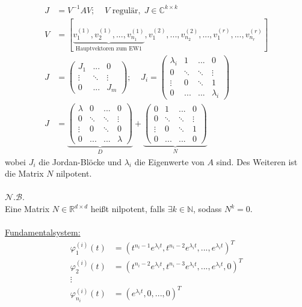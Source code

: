 \documentclass[a4paper,twocolumn,10pt]{article}
\begin{document}
\begin{equation*}
\begin{split}
J&=V^{-1}AV;\;\;\;\;V\text{ regulär},\;J\in\mathbb{C}^{k\times k}\\
V&=[\underbrace{v_1^{(1)},v_2^{(1)},...,v_{n_1}^{(1)}}_{\text{Hauptvektoren zum EW1}},v_1^{(2)},...,v_{n_2}^{(2)},...,v_1^{(r)},...,v_{n_r}^{(r)}]\\
J&=\begin{pmatrix}J_1 & ... & 0 \\ \vdots & \ddots & \vdots \\ 0 & ... & J_m\end{pmatrix};\;\;\;\;J_i=\begin{pmatrix}\lambda_i & 1 & ... & 0 \\ 0 & \ddots & \ddots & \vdots \\ \vdots & 0 & \ddots & 1 \\ 0 & ... & ... & \lambda_i\end{pmatrix}\\
J&=\underbrace{\begin{pmatrix}\lambda & 0 & ... & 0 \\ 0 & \ddots & \ddots & \vdots \\ \vdots & 0 & \ddots & 0 \\ 0 & ... & ... & \lambda\end{pmatrix}}_{D}+\underbrace{\begin{pmatrix}0 & 1 & ... & 0 \\ 0 & \ddots & \ddots & \vdots \\ \vdots & 0 & \ddots & 1 \\ 0 & ... & ... & 0\end{pmatrix}}_{N}
\end{split}
\end{equation*}
wobei $J_i$ die Jordan-Blöcke und $\lambda_i$ die Eigenwerte von $A$ sind. Des Weiteren ist die Matrix $N$ nilpotent.\\\\
\underline{$\mathcal{N.B.}$}\\
Eine Matrix $N\in\mathbb{R}^{d\times d}$ heißt nilpotent, falls $\exists k\in\mathbb{N}$, sodass $N^k=0$.\\\\
\underline{Fundamentalsystem:}
\begin{equation*}
\begin{split}
\varphi_1^{(i)}(t)&=(t^{n_i-1}e^{\lambda_it},t^{n_i-2}e^{\lambda_it},...,e^{\lambda_it})^T\\
\varphi_2^{(i)}(t)&=(t^{n_i-2}e^{\lambda_it},t^{n_i-3}e^{\lambda_it},...,e^{\lambda_it},0)^T\\
\vdots\\
\varphi_{n_i}^{(i)}(t)&=(e^{\lambda_it},0,...,0)^T
\end{split}
\end{equation*}
\end{document}
